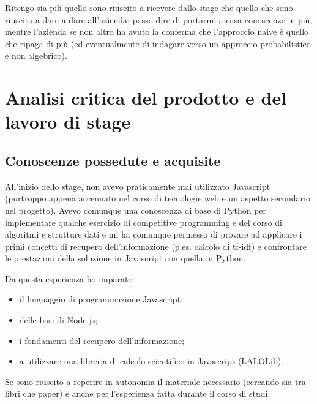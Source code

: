 Ritengo sia più quello sono riuscito a ricevere dallo stage che quello che sono riuscito a dare a dare all'azienda: posso dire di portarmi a casa conoscenze in più, mentre l'azienda se non altro ha avuto la conferma che l'approccio naive è quello che ripaga di più (ed eventualmente di indagare verso un approccio probabilistico e non algebrico).

\section{Analisi critica del prodotto e del lavoro di stage}
\subsection{Conoscenze possedute e acquisite}
All'inizio dello stage, non avevo praticamente mai utilizzato Javascript (purtroppo appena accennato nel corso di tecnologie web e un aspetto secondario nel progetto). Avevo comunque una conoscenza di base di Python per implementare qualche esercizio di competitive programming e del corso di algoritmi e strutture dati e mi ha comunque permesso di provare ad applicare i primi concetti di recupero dell'informazione (p.es. calcolo di tf-idf) e confrontare le prestazioni della soluzione in Javascript con quella in Python.

Da questa esperienza ho imparato
\begin{itemize}
    \item il linguaggio di programmazione Javascript;
    \item delle basi di Node.js;
    \item i fondamenti del recupero dell'informazione;
    \item a utilizzare una libreria di calcolo scientifico in Javascript (LALOLib).
\end{itemize}

Se sono riuscito a reperire in autonomia il materiale necessario (cercando sia tra libri che paper) è anche per l'esperienza fatta durante il corso di studi.


